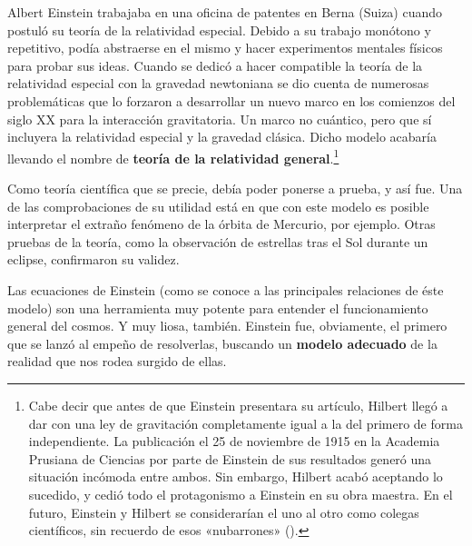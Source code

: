 \documentclass[11pt,a4paper,titlepage]{article}
\begin{document}
Albert Einstein trabajaba en una oficina de patentes en Berna (Suiza) cuando postuló su teoría de la relatividad especial. Debido a su trabajo monótono y repetitivo, podía abstraerse en el mismo y hacer experimentos mentales físicos para probar sus ideas. Cuando se dedicó a hacer compatible la teoría de la relatividad especial con la gravedad newtoniana se dio cuenta de numerosas problemáticas que lo forzaron a desarrollar un nuevo marco en los comienzos del siglo XX para la interacción gravitatoria. Un marco no cuántico, pero que sí incluyera la relatividad especial y la gravedad clásica. Dicho modelo acabaría llevando el nombre de \textbf{teoría de la relatividad general}.\footnote{Cabe decir que antes de que Einstein presentara su artículo, Hilbert llegó a dar con una ley de gravitación completamente igual a la del primero de forma independiente. La publicación el 25 de noviembre de 1915 en la Academia Prusiana de Ciencias por parte de Einstein de sus resultados generó una situación incómoda entre ambos. Sin embargo, Hilbert acabó aceptando lo sucedido, y cedió todo el protagonismo a Einstein en su obra maestra. En el futuro, Einstein y Hilbert se considerarían el uno al otro como colegas científicos, sin recuerdo de esos «nubarrones» (\cite[p.~49-50]{teoriaperfecta}).}

Como teoría científica que se precie, debía poder ponerse a prueba, y así fue. Una de las comprobaciones de su utilidad está en que con este modelo es posible interpretar el extraño fenómeno de la órbita de Mercurio, por ejemplo. Otras pruebas de la teoría, como la observación de estrellas tras el Sol durante un eclipse, confirmaron su validez.

Las ecuaciones de Einstein (como se conoce a las principales relaciones de éste modelo) son una herramienta muy potente para entender el funcionamiento general del cosmos. Y muy liosa, también. Einstein fue, obviamente, el primero que se lanzó al empeño de resolverlas, buscando un \textbf{modelo adecuado} de la realidad que nos rodea surgido de ellas.
\end{document}
